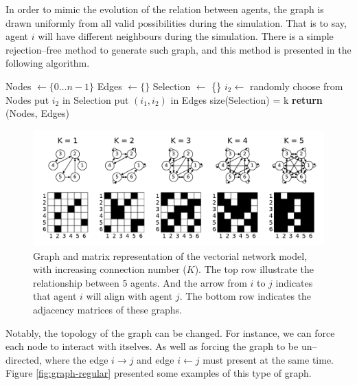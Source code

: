 \documentclass[11pt,twoside]{report}
\begin{document}
In order to mimic the evolution of the relation between agents, the graph is drawn uniformly from all valid possibilities during the simulation. That is to say, agent $i$ will have different neighbours during the simulation. There is a simple rejection--free method to generate such graph, and this method is presented in the following algorithm.

\begin{tcolorbox}[
title=Algorithm to generate the graph for VNM,
enlarge bottom by=0.5em,
enlarge top by=0.5em,
]

\label{alg:graph-vnm}
\begin{algorithmic}

\State Nodes $\gets \{0 \dots n-1 \}$
\State Edges $\gets \{\}$
	\State Selection $\gets$ \{\}
	\Repeat
		\State $i_2 \gets$  randomly choose from Nodes
			\State put $i_2$ in Selection
			\State put $(i_1, i_2)$ in Edges
		\EndIf
	\Until size(Selection) = k
\EndFor
\State \textbf{return} (Nodes, Edges)
\EndProcedure
\end{algorithmic}

\end{tcolorbox}


\begin{figure}
  \includegraphics[width=\linewidth]{graph-vnm}
  \caption{Graph and matrix representation of the vectorial network model, with increasing connection number ($K$). The top row illustrate the relationship between 5 agents. And the arrow from $i$ to $j$ indicates that agent $i$ will align with agent $j$. The bottom row indicates the adjacency matrices of these graphs. }
  \label{fig:graph-vnm}
\end{figure}

Notably, the topology of the graph can be changed. For instance, we can force each node to interact with itselves. As well as forcing the graph to be un--directed, where the edge $i \rightarrow j$ and edge $i \leftarrow j$ must present at the same time. Figure \ref{fig:graph-regular} presented some examples of this type of graph.
\end{document}
